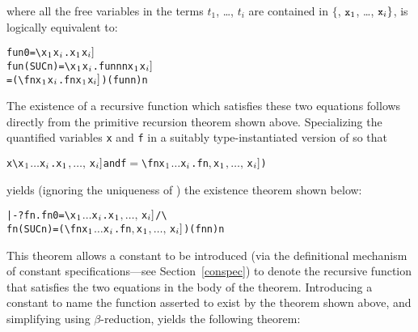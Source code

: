 \noindent where all the free variables in the  terms $t_1$,
\dots, $t_i$ are contained in $\{$, $\ml{x}_1$, \dots, $\ml{x}_i\}$,
is logically equivalent to:

\begin{hol}\begin{alltt}
   fun 0       = \verb!\!x\(\sb{1}\) \m{\dots} x\(\sb{i}\).\m{f\sb{1}[}x\(\sb{1}\)\m{,\ldots,\,}x\(\sb{i}]\)
   fun (SUC n) = \verb!\!x\(\sb{1}\) \m{\dots} x\(\sb{i}\).\m{f\sb{2}[}fun n  n\m{,}x\(\sb{1}\)\m{,\ldots,\,}x\(\sb{i}]\)
               = (\verb!\!f n x\(\sb{1}\) \m{\dots} x\(\sb{i}\).\m{f\sb{2}[}f  n\m{,} x\(\sb{1}\)\m{,\ldots,\,}x\(\sb{i}]\)) (fun n) n
\end{alltt}\end{hol}

The existence  of  a  recursive  function   which  satisfies these two
equations follows directly from the primitive recursion theorem
 shown above.   Specializing the  quantified variables \verb!x!
and \verb!f!  in  a suitably  type-instantiated version  of  so
that

\begin{hol}\begin{alltt}
   x\m{=}\verb!\!x\(\sb{1}\) \(\dots\) x\(\sb{i}\).\m{f\sb{1}[}x\(\sb{1}\)\(,\ldots,\,\)x\(\sb{i}]\)  {\rm and}  f\(=\)\verb!\!f n x\(\sb{1}\) \(\dots\) x\(\sb{i}\).\m{f\sb{2}[}f  n\(,\) x\(\sb{1}\)\(,\ldots,\,\)x\(\sb{i}]\))
\end{alltt}\end{hol}

\noindent yields (ignoring the uniqueness of )
the existence theorem shown below:

\begin{hol}\begin{alltt}
   |- ?fn. fn 0       = \verb!\!x\(\sb{1}\) \(\dots\) x\(\sb{i}\).\m{f\sb{1}[}x\(\sb{1}\)\(,\ldots,\,\)x\(\sb{i}]\) /\verb!\!
           fn (SUC n) = (\verb!\!f n x\(\sb{1}\) \(\dots\) x\(\sb{i}\).\m{f\sb{2}[}f  n\(,\) x\(\sb{1}\)\(,\ldots,\,\)x\(\sb{i}]\)) (fn n) n
\end{alltt}\end{hol}

\noindent This theorem allows a constant  to be introduced (via the
definitional mechanism of constant specifications---see Section~\ref{conspec})
to denote the recursive function that satisfies the two equations in the body
of the theorem. Introducing a constant  to name the function asserted
to exist by the theorem shown above, and simplifying using $\beta$-reduction,
yields the following theorem:

